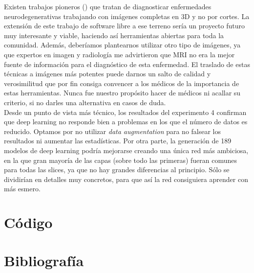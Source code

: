 Existen trabajos pioneros (\cite{irojas}) que tratan de diagnosticar enfermedades neurodegenerativas trabajando con imágenes completas en 3D y no por cortes. La extensión de este trabajo de software libre a ese terreno sería un proyecto futuro muy interesante y viable, haciendo así herramientas abiertas para toda la comunidad. Además, deberíamos plantearnos utilizar otro tipo de imágenes, ya que expertos en imagen y radiología me advirtieron que MRI no era la mejor fuente de información para el diagnóstico de esta enfermedad. El traslado de estas técnicas a imágenes más potentes puede darnos un salto de calidad y verosimilitud que por fin consiga convencer a los médicos de la importancia de estas herramientas. Nunca fue nuestro propósito hacer de médicos ni acallar su criterio, si no darles una alternativa en casos de duda. \\

Desde un punto de vista más técnico, los resultados del experimento 4 confirman que deep learning no responde bien a problemas en los que el número de datos es reducido. Optamos por no utilizar \textit{data augmentation} para no falsear los resultados ni aumentar las estadísticas. Por otra parte, la generación de 189 modelos de deep learning podría mejorarse creando una única red más ambiciosa, en la que gran mayoría de las capas (sobre todo las primeras) fueran comunes para todas las slices, ya que no hay grandes diferencias al principio. Sólo se dividirían en detalles muy concretos, para que así la red consiguiera aprender con más esmero. 
\newpage

\section{Código}

\newpage
\section{Bibliografía}







\appendix
\clearpage
\addappheadtotoc
\appendixpage



 


